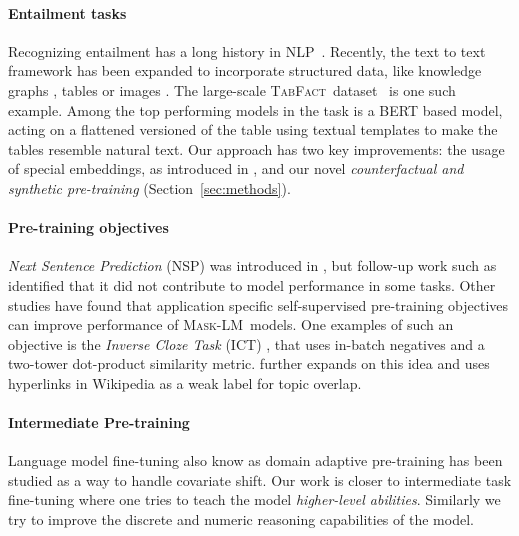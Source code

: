 \documentclass[11pt,a4paper]{article}
\newcommand{\tabfact}{\textsc{TabFact}\xspace}
\newcommand{\masklm}{\textsc{Mask-LM}\xspace}
\theoremstyle{definition}
\begin{document}
\paragraph{Entailment tasks}
Recognizing entailment has a long history in NLP~\cite{dagan-10}. Recently, the text to text framework has been expanded to incorporate structured data, like knowledge graphs \cite{vlachos-riedel-2015-identification}, tables \cite{jo2019aggchecker,gupta2020infotabs} or images \cite{suhr2017corpus,suhr2019corpus}.
The large-scale \tabfact~dataset~\cite{2019TabFactA} is one such example. Among the top performing models in the task is a BERT based model, acting on a flattened versioned of the table using textual templates to make the tables resemble natural text. Our approach has two key improvements: the usage of special embeddings, as introduced in \citet{herzig-2020}, and our novel \emph{counterfactual and synthetic pre-training} (Section~\ref{sec:methods}).

\paragraph{Pre-training objectives}
\emph{Next Sentence Prediction} (NSP) was introduced in \citet{devlin-19}, but follow-up work such as \citet{liu2019} identified that it did not contribute to model performance in some tasks. 
Other studies have found that application specific self-supervised pre-training objectives can improve performance of \masklm~models. One examples of such an objective is the \emph{Inverse Cloze Task} (ICT) \cite{lee-19}, that uses in-batch negatives and a two-tower dot-product similarity metric. 
\citet{Chang2020Pre-training} further expands on this idea and uses hyperlinks in Wikipedia as a weak label for topic overlap.

\paragraph{Intermediate Pre-training}
Language model fine-tuning \cite{howard-2018-universal} also know as domain adaptive pre-training \cite{gururangan-2020-dont-stop} has been studied as a way to handle covariate shift.
Our work is closer to intermediate task fine-tuning \cite{pruksachatkun-2020-intermediate-task} 
where one tries to teach the model \emph{higher-level abilities}.
Similarly we try to improve the discrete and numeric reasoning capabilities of the model.
\end{document}
